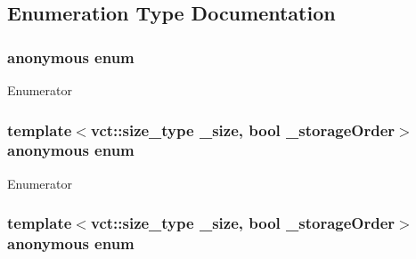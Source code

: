 \subsection{Enumeration Type Documentation}
\hypertarget{group__cisst_numerical_ga11fe473947c91d5034249f2b80810a32}{}\subsubsection[{anonymous enum}]{\setlength{\rightskip}{0pt plus 5cm}anonymous enum}\label{group__cisst_numerical_ga11fe473947c91d5034249f2b80810a32}
\begin{Desc}
\item[Enumerator]\par
\begin{description}
\item[{\em 
\hypertarget{group__cisst_numerical_gga11fe473947c91d5034249f2b80810a32a7aa4b91bbfeaafff839f5290659f8067}{}N\+B\label{group__cisst_numerical_gga11fe473947c91d5034249f2b80810a32a7aa4b91bbfeaafff839f5290659f8067}
}]\end{description}
\end{Desc}
\hypertarget{group__cisst_numerical_gaaa50211a1982cdcebad790dbf4e72488}{}\subsubsection[{anonymous enum}]{\setlength{\rightskip}{0pt plus 5cm}template$<$vct\+::size\+\_\+type \+\_\+size, bool \+\_\+storage\+Order$>$ anonymous enum}\label{group__cisst_numerical_gaaa50211a1982cdcebad790dbf4e72488}
\begin{Desc}
\item[Enumerator]\par
\begin{description}
\item[{\em 
\hypertarget{group__cisst_numerical_ggaaa50211a1982cdcebad790dbf4e72488ab8624d51cb7feed9f3452930fadcb46b}{}M\+A\+X\+\_\+\+S\+I\+Z\+E\+\_\+1\label{group__cisst_numerical_ggaaa50211a1982cdcebad790dbf4e72488ab8624d51cb7feed9f3452930fadcb46b}
}]\end{description}
\end{Desc}
\hypertarget{group__cisst_numerical_gaa55ba5b1d32262c552dd42d0f2e9254f}{}\subsubsection[{anonymous enum}]{\setlength{\rightskip}{0pt plus 5cm}template$<$vct\+::size\+\_\+type \+\_\+size, bool \+\_\+storage\+Order$>$ anonymous enum}\label{group__cisst_numerical_gaa55ba5b1d32262c552dd42d0f2e9254f}
